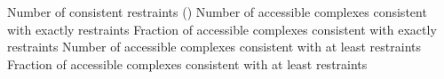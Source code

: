 \bTABLE
\bTR
\bTD Number of consistent restraints ()      \eTD \bTD Number of accessible complexes consistent with exactly  restraints      \eTD \bTD Fraction of accessible complexes consistent with exactly  restraints    \eTD \bTD Number of accessible complexes consistent with at least  restraints     \eTD \bTD Fraction of accessible complexes consistent with at least  restraints \eTD
\eTR
\bTR
{}        \eTD {}        \eTD {}   \eTD {}        \eTD {} \eTD
\eTR
\bTR
{}        \eTD {}         \eTD {}   \eTD {}         \eTD {} \eTD
\eTR
\bTR
{}        \eTD {}         \eTD {}   \eTD {}         \eTD {} \eTD
\eTR
\bTR
{}        \eTD {}          \eTD {}   \eTD {}          \eTD {} \eTD
\eTR
\bTR
{}        \eTD {}          \eTD {}   \eTD {}          \eTD {} \eTD
\eTR
\bTR
{}        \eTD {}           \eTD {}   \eTD {}           \eTD {} \eTD
\eTR
\bTR
{}        \eTD {}            \eTD {}   \eTD {}            \eTD {} \eTD
\eTR
\bTR
{}        \eTD {}              \eTD {}   \eTD {}              \eTD {} \eTD
\eTR
\bTR
{}        \eTD {}                \eTD {}   \eTD {}                \eTD {} \eTD
\eTR
\eTABLE
